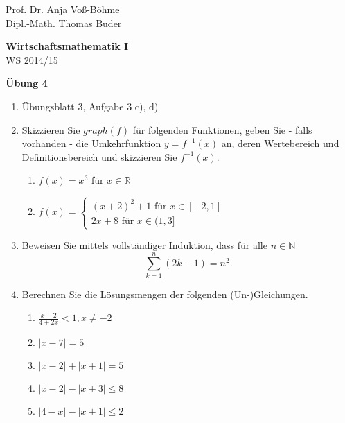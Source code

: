 \documentclass[12pt,a4paper]{scrreprt}
\newcommand{\N}{\mathds{N}}
\newcommand{\R}{\mathds{R}}
\begin{document}
 
\begin{flushleft}
Prof. Dr.  Anja Voß-Böhme \\
Dipl.-Math. Thomas Buder
\end{flushleft}

\begin{center}{\large\bf Wirtschaftsmathematik I} \\ WS 2014/15 \end{center}

\begin{center}{\large\bf Übung 4 } 
\end{center}


\bigskip
\begin{enumerate}
\item Übungsblatt 3, Aufgabe 3 c), d)
\item Skizzieren Sie $graph(f)$ für folgenden Funktionen, geben Sie  - falls vorhanden - die Umkehrfunktion $y=f^{-1}(x)$ an,  deren Wertebereich und Definitionsbereich und skizzieren Sie $f^{-1}(x)$.
		\begin{enumerate}
			\item $f(x)=x^3$ für $x \in \R$
			\item $f(x)= \begin{cases}
													(x+2)^2+1 \text{ für  } x \in [-2,1] \\
													2x+8 \text{ für  } x \in (1,3]
										\end{cases}$
			\end{enumerate}
\item Beweisen Sie mittels vollständiger Induktion, dass für alle $n \in \N$ \[ \sum\limits_{k=1}^n (2k-1) = n^2.\]
\item Berechnen Sie die Lösungsmengen der folgenden (Un-)Gleichungen.
			\begin{enumerate}
			  \item $\frac{x-2}{4+2x} < 1,  x \neq -2$
				\item $|x-7| = 5$
				\item $|x-2| + |x+1| = 5$
				\item $|x - 2| - |x + 3| \leq 8$
				\item $|4 - x| - |x + 1| \leq 2$



\end{enumerate}
\end{enumerate}
\end{document}
